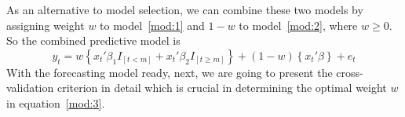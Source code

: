 As an alternative to model selection, we can combine these two models by assigning weight $w$ to model~\ref{mod:1} and $1 - w$ to model~\ref{mod:2}, where $w \geq 0$. So the combined predictive model is
\begin{equation} \label{mod:3}
    y_{t} = w \left\{ x_t'\beta_1 I_{[t<m]} + x_t'\beta_2 I_{[t \geq m]} \right\} + (1 - w) \left\{ x_t'\beta \right\} + e_t
\end{equation}
With the forecasting model ready, next, we are going to present the cross-validation criterion in detail which is crucial in determining the optimal weight $w$ in equation~\ref{mod:3}.